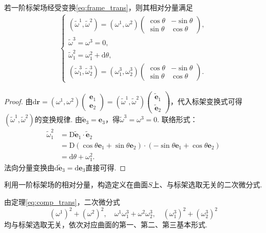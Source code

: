 \documentclass[../../main.tex]{subfiles}%
\begin{document}
\begin{theorem}
若一阶标架场经受变换\eqref{eq:frame_trans}，则其相对分量满足
\begin{align}
\begin{cases}
(\tilde{\omega}^1,\tilde{\omega}^2) = (\omega^1,\omega^2)\begin{pmatrix}
\cos\theta & -\sin\theta \\
\sin\theta & \cos\theta
\end{pmatrix}, \\
\tilde{\omega}^3 = \omega^3 = 0, \\
\tilde{\omega}_1^2 = \omega_1^2 + \mathrm{d}\theta, \\
(\tilde{\omega}_1^3,\tilde{\omega}_2^3) = (\omega_1^3,\omega_2^3)\begin{pmatrix}
\cos\theta & -\sin\theta \\
\sin\theta & \cos\theta
\end{pmatrix}.
\end{cases} \label{eq:comp_trans}
\end{align}
\end{theorem}

\begin{proof}
由$\mathrm{d}\boldsymbol{r}=(\omega^1,\omega^2)\begin{pmatrix}\boldsymbol{e}_1\\\boldsymbol{e}_2\end{pmatrix}=(\tilde{\omega}^1,\tilde{\omega}^2)\begin{pmatrix}\tilde{\boldsymbol{e}}_1\\\tilde{\boldsymbol{e}}_2\end{pmatrix}$，代入标架变换式可得$(\tilde{\omega}^1,\tilde{\omega}^2)$的变换规律.
由$\tilde{\boldsymbol{e}}_3=\boldsymbol{e}_3$，得$\tilde{\omega}^3=\omega^3=0$.
联络形式：
\begin{align*}
\tilde{\omega}_1^2 &= \mathrm{D}\tilde{\boldsymbol{e}}_1\cdot\tilde{\boldsymbol{e}}_2 \\
&= \mathrm{D}(\cos\theta\boldsymbol{e}_1+\sin\theta\boldsymbol{e}_2)\cdot(-\sin\theta\boldsymbol{e}_1+\cos\theta\boldsymbol{e}_2) \\
&= \mathrm{d}\theta + \omega_1^2.
\end{align*}
法向分量变换由$\mathrm{d}\tilde{\boldsymbol{e}}_3=\mathrm{d}\boldsymbol{e}_3$直接可得.
\end{proof}

\begin{example}
利用一阶标架场的相对分量，构造定义在曲面$S$上、与标架选取无关的二次微分式.\begin{solution}
由定理\eqref{eq:comp_trans}，二次微分式
$$(\omega^1)^2+(\omega^2)^2,\quad \omega^1\omega_1^3+\omega^2\omega_2^3,\quad (\omega_1^3)^2+(\omega_2^3)^2$$
均与标架选取无关，依次对应曲面的第一、第二、第三基本形式.

\end{solution}
\end{example}
\end{document}
